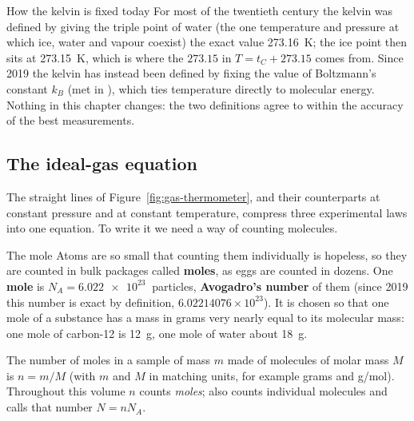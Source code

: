 
\begin{remarkbox}{How the kelvin is fixed today}
For most of the twentieth century the kelvin was defined by giving the triple point of water (the one
temperature and pressure at which ice, water and vapour coexist) the exact value \SI{273.16}{K}; the
ice point then sits at \SI{273.15}{K}, which is where the $273.15$ in $T=t_C+273.15$ comes from. Since
2019 the kelvin has instead been defined by fixing the value of Boltzmann's constant $k_B$ (met in
), which ties temperature directly to molecular energy. Nothing in this chapter
changes: the two definitions agree to within the accuracy of the best measurements.
\end{remarkbox}

\subsection{The ideal-gas equation}\label{sec:gaslaw}

The straight lines of Figure~\ref{fig:gas-thermometer}, and their counterparts at constant pressure and
at constant temperature, compress three experimental laws into one equation. To write it we need a way
of counting molecules.

\begin{defbox}{The mole}
Atoms are so small that counting them individually is hopeless, so they are counted in bulk packages
called \textbf{moles}, as eggs are counted in dozens. One \textbf{mole} is
$N_A = \SI{6.022e23}{}$ particles, \textbf{Avogadro's number} of them (since 2019 this number is exact
by definition, $6.02214076\times10^{23}$). It is chosen so that one mole of a substance has a mass in
grams very nearly equal to its molecular mass: one mole of carbon-12 is \SI{12}{g}, one mole of water
about \SI{18}{g}.

\smallskip
The number of moles in a sample of mass $m$ made of molecules of molar mass $M$ is $n = m/M$ (with $m$
and $M$ in matching units, for example grams and \si{g/mol}). Throughout this volume $n$ counts
\emph{moles};  also counts individual molecules and calls that number $N = nN_A$.
\end{defbox}

